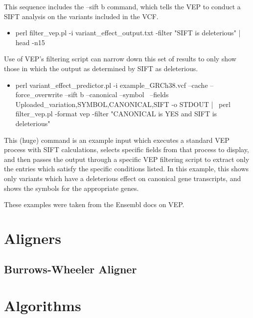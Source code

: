 \documentclass[12pt]{report}
\begin{document}
This sequence includes the --sift b command, which tells the VEP to conduct a SIFT analysis on the variants included in the VCF. 


\begin{itemize}
	\item perl filter\_vep.pl -i variant\_effect\_output.txt -filter "SIFT is deleterious" | head -n15
\end{itemize}

Use of VEP's filtering script can narrow down this set of results to only show those in which the output as determined by SIFT as deleterious.

\begin{itemize}
	\item perl variant\_effect\_predictor.pl -i example\_GRCh38.vcf --cache --force\_overwrite --sift b --canonical --symbol \
	--fields Uploaded\_variation,SYMBOL,CANONICAL,SIFT -o STDOUT | \
	perl filter\_vep.pl -format vep -filter "CANONICAL is YES and SIFT is deleterious"
\end{itemize}

This (huge) command is an example input which executes a standard VEP process with SIFT calculations, selects specific fields from that process to display, and then passes the output through a specific VEP filtering script to extract only the entries which satisfy the specific conditions listed. In this example, this shows only variants which have a deleterious effect on canonical gene transcripts, and shows the symbols for the appropriate genes.

These examples were taken from the Ensembl docs on VEP.


\chapter*{Aligners}
\section*{Burrows-Wheeler Aligner}




\chapter*{Algorithms}
\end{document}
